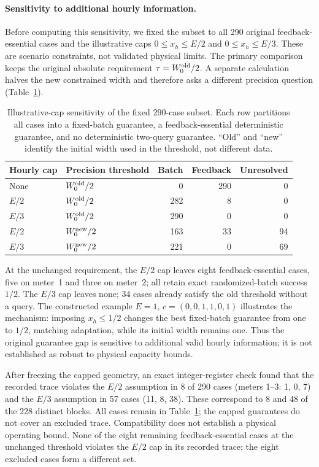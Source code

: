 \paragraph{Sensitivity to additional hourly information.}
Before computing this sensitivity, we fixed the subset to all 290
original feedback-essential cases and the illustrative caps
$0\leq x_h\leq E/2$ and $0\leq x_h\leq E/3$.
These are scenario constraints, not validated physical limits. The primary comparison
keeps the original absolute requirement $\tau=W_0^{\rm old}/2$.
A separate calculation halves the new constrained width and therefore
asks a different precision question (Table~\ref{tab:counter-caps}).

\begin{table}[htbp]\centering\small
\caption{Illustrative-cap sensitivity of the fixed 290-case subset.
Each row partitions all cases into a fixed-batch guarantee, a
feedback-essential deterministic guarantee, and no deterministic
two-query guarantee. ``Old'' and ``new'' identify the initial width used
in the threshold, not different data.}
\label{tab:counter-caps}
\begin{tabular}{llrrr}\toprule
Hourly cap & Precision threshold & Batch & Feedback & Unresolved\\\midrule
None & $W_0^{\rm old}/2$ & 0 & 290 & 0\\
$E/2$ & $W_0^{\rm old}/2$ & 282 & 8 & 0\\
$E/3$ & $W_0^{\rm old}/2$ & 290 & 0 & 0\\
$E/2$ & $W_0^{\rm new}/2$ & 163 & 33 & 94\\
$E/3$ & $W_0^{\rm new}/2$ & 221 & 0 & 69\\\bottomrule
\end{tabular}\end{table}

At the unchanged requirement, the $E/2$ cap leaves eight feedback-essential
cases, five on meter~1 and three on meter~2; all retain exact randomized-batch
success $1/2$. The $E/3$ cap leaves none; 34 cases already satisfy the
old threshold without a query. The constructed example
$E=1$, $c=(0,0,1,1,0,1)$ illustrates the mechanism: imposing $x_h\leq1/2$
changes the best fixed-batch guarantee from one to $1/2$, matching
adaptation, while its initial width remains one.
Thus the original guarantee gap is sensitive to additional valid hourly
information; it is not established as robust to physical capacity bounds.

After freezing the capped geometry, an exact integer-register check found
that the recorded trace violates the $E/2$ assumption in 8 of 290 cases
(meters 1--3: 1, 0, 7) and the $E/3$ assumption in 57 cases (11, 8, 38).
These correspond to 8 and 48 of the 228 distinct blocks. All cases remain
in Table~\ref{tab:counter-caps}; the capped guarantees do not cover an
excluded trace. Compatibility does not establish a physical operating bound.
None of the eight remaining feedback-essential cases at the unchanged
threshold violates the $E/2$ cap in its recorded trace; the eight excluded
cases form a different set.

